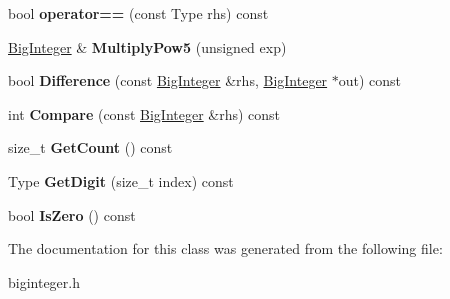 \begin{DoxyCompactItemize}
\item 
bool {\bfseries operator==} (const Type rhs) const \hypertarget{a00048_a329eddac1b724f82d56af2ee2c8abcc4}{}\label{a00048_a329eddac1b724f82d56af2ee2c8abcc4}

\item 
\hyperlink{a00048}{Big\+Integer} \& {\bfseries Multiply\+Pow5} (unsigned exp)\hypertarget{a00048_a98a13f169c27d1acfa57054f37c61763}{}\label{a00048_a98a13f169c27d1acfa57054f37c61763}

\item 
bool {\bfseries Difference} (const \hyperlink{a00048}{Big\+Integer} \&rhs, \hyperlink{a00048}{Big\+Integer} $\ast$out) const \hypertarget{a00048_a5741304ce36392adeef716e78b384b61}{}\label{a00048_a5741304ce36392adeef716e78b384b61}

\item 
int {\bfseries Compare} (const \hyperlink{a00048}{Big\+Integer} \&rhs) const \hypertarget{a00048_afd8b15480df5003ee6b6e1b8ecbf5f45}{}\label{a00048_afd8b15480df5003ee6b6e1b8ecbf5f45}

\item 
size\+\_\+t {\bfseries Get\+Count} () const \hypertarget{a00048_a720114cef0871c9f9c3c6a5f3a66e66a}{}\label{a00048_a720114cef0871c9f9c3c6a5f3a66e66a}

\item 
Type {\bfseries Get\+Digit} (size\+\_\+t index) const \hypertarget{a00048_a92c6854f2388875374cfb9801bea0cc8}{}\label{a00048_a92c6854f2388875374cfb9801bea0cc8}

\item 
bool {\bfseries Is\+Zero} () const \hypertarget{a00048_a99cf9cb87491a583c6b7614b0c8654fe}{}\label{a00048_a99cf9cb87491a583c6b7614b0c8654fe}

\end{DoxyCompactItemize}


The documentation for this class was generated from the following file\+:\begin{DoxyCompactItemize}
\item 
biginteger.\+h\end{DoxyCompactItemize}

